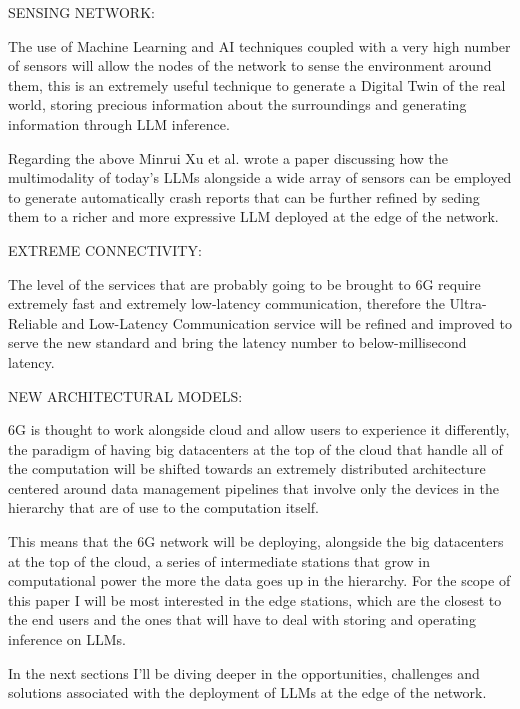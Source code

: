 \bigskip
\noindent
SENSING NETWORK:
\label{ssec:sensing-network}

The use of Machine Learning and AI techniques coupled with a very high number of sensors will allow
the nodes of the network to sense the environment around them, this is an extremely useful technique to generate a Digital Twin of the real world, storing precious information about the surroundings and generating information through LLM inference.

Regarding the above Minrui Xu et al. \cite{pga} wrote a paper discussing how the multimodality of today’s LLMs alongside a wide array of sensors can be employed to generate automatically crash reports that can be further refined by seding them to a richer and more expressive LLM deployed at the edge of the network.

\bigskip
\noindent
EXTREME CONNECTIVITY:
\label{ssec:extreme-connectivity}

The level of the services that are probably going to be brought to 6G require extremely fast and extremely
low-latency communication, therefore the Ultra-Reliable and Low-Latency Communication service will be refined and improved to serve the new standard and bring the latency number to below-millisecond latency.

\bigskip
\noindent
NEW ARCHITECTURAL MODELS:
\label{ssec:architectural-models}

6G is thought to work alongside cloud and allow users to experience it differently, the paradigm of having
big datacenters at the top of the cloud that handle all of the computation will be shifted towards an extremely distributed architecture centered around data management pipelines that involve only the devices in the hierarchy that are of use to the computation itself.

This means that the 6G network will be deploying, alongside the big datacenters at the top of the cloud, a series of intermediate stations that grow in computational power the more the data goes up in the hierarchy. For the scope of this paper I will be most interested in the edge stations, which are the closest to the end users and the ones that will have to deal with storing and operating inference on LLMs.

\medskip
In the next sections I’ll be diving deeper in the opportunities, challenges and solutions associated with the deployment of LLMs at the edge of the network.
